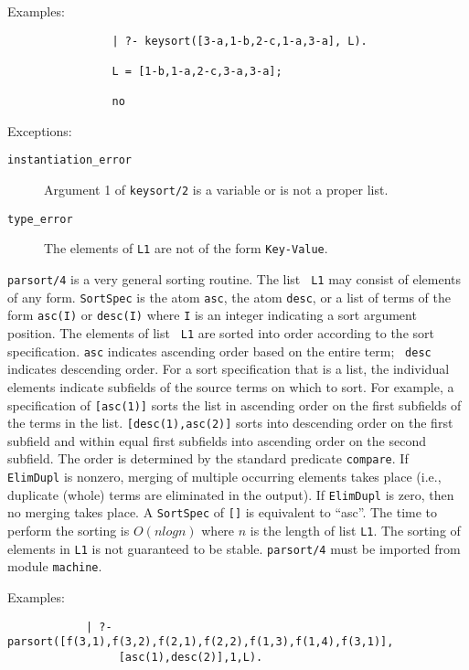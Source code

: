 \begin{description}
    Examples:
    {\footnotesize
     \begin{verbatim}
                | ?- keysort([3-a,1-b,2-c,1-a,3-a], L).

                L = [1-b,1-a,2-c,3-a,3-a];

                no
     \end{verbatim}}
    Exceptions:
    \begin{description}
    \item[{\tt instantiation\_error}]
	Argument 1 of {\tt keysort/2} is a variable or is not a proper list.
    \item[{\tt type\_error}]
	The elements of {\tt L1} are not of the form \verb'Key-Value'.
    \end{description}


    {\tt parsort/4} is a very general sorting routine.  The list {\tt
    L1} may consist of elements of any form.  {\tt SortSpec} is the
    atom {\tt asc}, the atom {\tt desc}, or a list of terms of the
    form {\tt asc(I)} or {\tt desc(I)} where {\tt I} is an integer
    indicating a sort argument position.  The elements of list {\tt
    L1} are sorted into order according to the sort specification.
    {\tt asc} indicates ascending order based on the entire term; {\tt
    desc} indicates descending order.  For a sort specification that
    is a list, the individual elements indicate subfields of the
    source terms on which to sort.  For example, a specification of
    {\tt [asc(1)]} sorts the list in ascending order on the first
    subfields of the terms in the list.  {\tt [desc(1),asc(2)]} sorts
    into descending order on the first subfield and within equal first
    subfields into ascending order on the second subfield.  The order
    is determined by the standard predicate {\tt compare}.  If {\tt
    ElimDupl} is nonzero, merging of multiple occurring elements takes
    place (i.e., duplicate (whole) terms are eliminated in the
    output).  If {\tt ElimDupl} is zero, then no merging takes place.
    A {\tt SortSpec} of {\tt []} is equivalent to ``asc''.  The time
    to perform the sorting is $O(n log n)$ where $n$ is the length of
    list {\tt L1}.  The sorting of elements in {\tt L1} is not
    guaranteed to be stable. {\tt parsort/4} must be imported from
    module {\tt machine}.

    Examples:
    {\footnotesize
     \begin{verbatim}
            | ?- parsort([f(3,1),f(3,2),f(2,1),f(2,2),f(1,3),f(1,4),f(3,1)],
                 [asc(1),desc(2)],1,L). 


\end{verbatim}}
\end{description}
